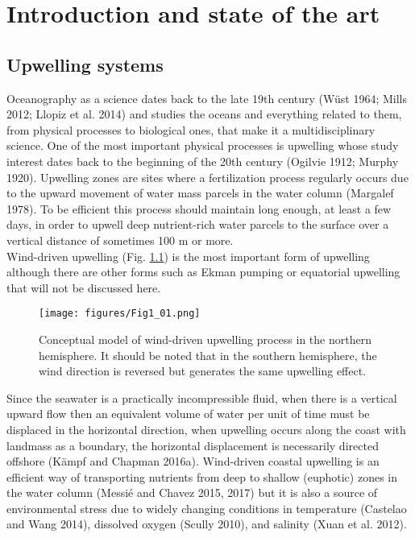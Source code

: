 \chapter{Introduction and state of the art}
\section{Upwelling systems}

Oceanography as a science dates back to the late 19th century \citep{Wust1964,Mill2012,LlopCowe2014}(Wüst 1964; Mills 2012; Llopiz et al. 2014) and studies the oceans and everything related to them, from physical processes to biological ones, that make it a multidisciplinary science. One of the most important physical processes is upwelling whose study interest dates back to the beginning of the 20th century \citep{Ogil1912,Murp1920}(Ogilvie 1912; Murphy 1920). Upwelling zones are sites where a fertilization process regularly occurs due to the upward movement of water mass parcels in the water column \citep{Marg1978}(Margalef 1978). To be efficient this process should maintain long enough, at least a few days, in order to upwell deep nutrient-rich water parcels to the surface over a vertical distance of sometimes 100 m or more.\\

Wind-driven upwelling (Fig. \ref{fig:Fig1_01}) is the most important form of upwelling although there are other forms such as Ekman pumping or equatorial upwelling that will not be discussed here.\\

\begin{figure}[ht]
	\centering
	\texttt{[image: figures/Fig1\_01.png]}
	\caption{Conceptual model of wind-driven upwelling process in the northern hemisphere. It should be noted that in the southern hemisphere, the wind direction is reversed but generates the same upwelling effect.}
	\label{fig:Fig1_01}
\end{figure}

Since the seawater is a practically incompressible fluid, when there is a vertical upward flow then an equivalent volume of water per unit of time must be displaced in the horizontal direction, when upwelling occurs along the coast with landmass as a boundary, the horizontal displacement is necessarily directed offshore \citep{KampCap2}(Kämpf and Chapman 2016a). Wind-driven coastal upwelling is an efficient way of transporting nutrients from deep to shallow (euphotic) zones in the water column \citep{MessChav2015,MessChav2017}(Messié and Chavez 2015, 2017) but it is also a source of environmental stress due to widely changing conditions in temperature \citep{CastWang2014}(Castelao and Wang 2014), dissolved oxygen \citep{Scul2010}(Scully 2010), and salinity \citep{XuanHuan2012}(Xuan et al. 2012).\\

